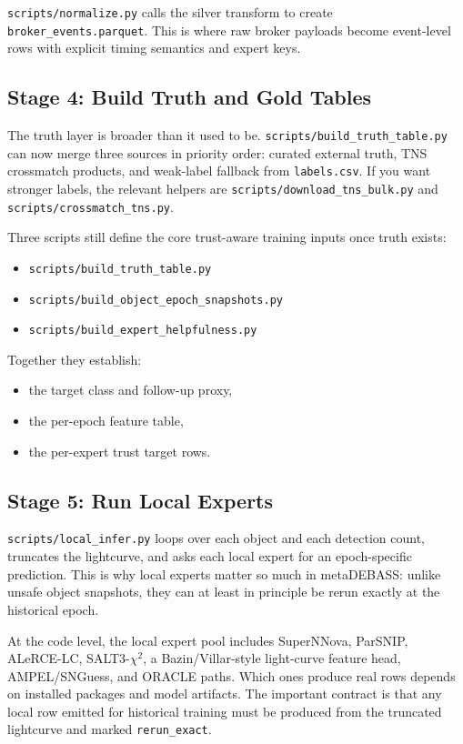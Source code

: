 \documentclass[11pt]{article}
\newcommand{\code}[1]{\texttt{#1}}
\begin{document}
\code{scripts/normalize.py} calls the silver transform to create \code{broker\_events.parquet}. This is where raw broker payloads become event-level rows with explicit timing semantics and expert keys.

\subsection{Stage 4: Build Truth and Gold Tables}

The truth layer is broader than it used to be. \code{scripts/build\_truth\_table.py} can now merge three sources in priority order: curated external truth, TNS crossmatch products, and weak-label fallback from \code{labels.csv}. If you want stronger labels, the relevant helpers are \code{scripts/download\_tns\_bulk.py} and \code{scripts/crossmatch\_tns.py}.

Three scripts still define the core trust-aware training inputs once truth exists:

\begin{itemize}
\item \code{scripts/build\_truth\_table.py}
\item \code{scripts/build\_object\_epoch\_snapshots.py}
\item \code{scripts/build\_expert\_helpfulness.py}
\end{itemize}

Together they establish:

\begin{itemize}
\item the target class and follow-up proxy,
\item the per-epoch feature table,
\item the per-expert trust target rows.
\end{itemize}

\subsection{Stage 5: Run Local Experts}

\code{scripts/local\_infer.py} loops over each object and each detection count, truncates the lightcurve, and asks each local expert for an epoch-specific prediction. This is why local experts matter so much in metaDEBASS: unlike unsafe object snapshots, they can at least in principle be rerun exactly at the historical epoch.

At the code level, the local expert pool includes SuperNNova, ParSNIP, ALeRCE-LC, SALT3-\(\chi^{2}\), a Bazin/Villar-style light-curve feature head, AMPEL/SNGuess, and ORACLE paths. Which ones produce real rows depends on installed packages and model artifacts. The important contract is that any local row emitted for historical training must be produced from the truncated lightcurve and marked \code{rerun\_exact}.
\end{document}
